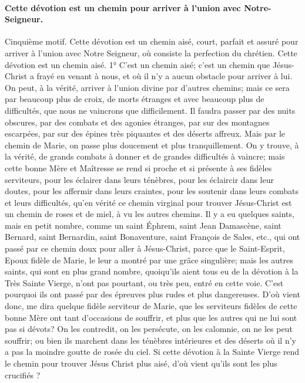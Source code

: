 \paragraph{Cette dévotion est un chemin pour arriver à l'union avec Notre-Seigneur.}
 Cinquième motif. Cette dévotion est un chemin aisé, court, parfait et assuré pour arriver à l'union avec Notre Seigneur, où consiste la perfection du chrétien.
Cette dévotion est un chemin aisé.
1° C'est un chemin aisé; c'est un chemin que Jésus-Christ a frayé en venant à nous, et où il n'y a aucun obstacle
pour arriver à lui. On peut, à la vérité, arriver à l'union divine par d'autres chemins; mais ce sera par beaucoup plus
de croix, de morts étranges et avec beaucoup plus de difficultés, que nous ne vaincrons que difficilement. Il faudra
passer par des nuits obscures, par des combats et des agonies étranges, par sur des montagnes escarpées, par
sur des épines très piquantes et des déserts affreux. Mais par le chemin de Marie, on passe plus doucement et
plus tranquillement.
On y trouve, à la vérité, de grands combats à donner et de grandes difficultés à vaincre; mais cette bonne Mère et
Maîtresse se rend si proche et si présente à ses fidèles serviteurs, pour les éclairer dans leurs ténèbres, pour les
éclaircir dans leur doutes, pour les affermir dans leurs craintes, pour les soutenir dans leurs combats et leurs
difficultés, qu'en vérité ce chemin virginal pour trouver Jésus-Christ est un chemin de roses et de miel, à vu les
autres chemins. Il y a eu quelques saints, mais en petit nombre, comme un saint Éphrem, saint Jean Damascène,
saint Bernard, saint Bernardin, saint Bonaventure, saint François de Sales, etc., qui ont passé par ce chemin doux
pour aller à Jésus-Christ, parce que le Saint-Esprit, Epoux fidèle de Marie, le leur a montré par une grâce
singulière; mais les autres saints, qui sont en plus grand nombre, quoiqu'ils aient tous eu de la dévotion à la Très
Sainte Vierge, n'ont pas pourtant, ou très peu, entré en cette voie. C'est pourquoi ils ont passé par des épreuves
plus rudes et plus dangereuses.
 D'où vient donc, me dira quelque fidèle serviteur de Marie, que les serviteurs fidèles de cette bonne Mère ont
tant d'occasions de souffrir, et plus que les autres qui ne lui sont pas si dévots? On les contredit, on les persécute,
on les calomnie, on ne les peut souffrir; ou bien ils marchent dans les ténèbres intérieures et des déserts où il n'y a
pas la moindre goutte de rosée du ciel. Si cette dévotion à la Sainte Vierge rend le chemin pour trouver Jésus Christ plus aisé, d'où vient qu'ils sont les plus crucifiés ?
